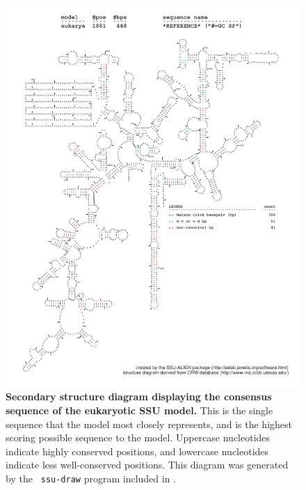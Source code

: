 \begin{figure}
\begin{center}
\includegraphics[width=5.7in]{Figures/eukarya-0p1-rf}
\end{center}
\caption[Secondary structure diagram displaying the consensus sequence
  of the eukaryotic SSU model]{\textbf{Secondary structure diagram displaying the
  consensus sequence of the eukaryotic SSU model.} 
  This is the single sequence that the model 
  most closely represents, and is the highest scoring possible
  sequence to the model. Uppercase nucleotides indicate highly conserved positions,
  and lowercase nucleotides indicate less well-conserved positions.
  This diagram was generated by the {\tt
  ssu-draw} program included in .}
\label{fig:eukrf}
\end{figure}


